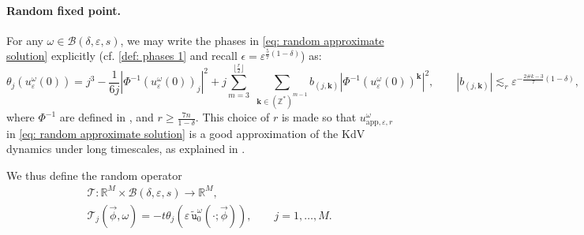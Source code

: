 \documentclass[a4paper,10pt,reqno]{article}
\theoremstyle{definition}
\theoremstyle{plain}
\theoremstyle{plain}
\theoremstyle{definition}
\theoremstyle{plain}
\theoremstyle{plain}
\theoremstyle{plain}
\theoremstyle{definition}
\theoremstyle{definition}
\def \Z{\mathbb Z}
\def \R{\mathbb R}
\def \k{\bm{k}}
\def \tu{\mathtt{u}}
\begin{document}
\paragraph{Random fixed point.}

For any $\omega\in\mathcal{B}(\delta,\varepsilon,s)$, we may write the phases in \eqref{eq: random approximate solution} explicitly (cf. \eqref{def: phases 1} and recall $\epsilon=\varepsilon^{\frac57 (1-\delta)}$) as:
\begin{equation}\label{eq: approx_phases random}
\theta_j(u_{\varepsilon}^{\omega}(0)) = j^3 - \frac{1}{6j} |\Phi^{-1}(u_{\varepsilon}^{\omega}(0))_j|^2 + j \sum_{m=3}^{\lfloor \frac{r}{2} \rfloor} \, \, \sum_{\k \in (\Z^*)^{m-1}} b_{(j,\k)} |\Phi^{-1}(u_{\varepsilon}^{\omega}(0))^{\k}|^2,  \qquad |b_{(j,\k)}| \lesssim_r \varepsilon^{-\frac{2\#k-3}{7}(1-\delta)},
\end{equation}
where $\Phi^{-1}$ are defined in , and $r \ge \frac{7n}{1-\delta}$. This choice of $r$ is made so that $u_{\mathrm{app},\varepsilon,r}^{\omega}$  in \eqref{eq: random approximate solution} is a good approximation of the KdV dynamics under long timescales, as explained in .

\medskip

We thus define the random operator
\begin{equation} \label{def: random phase nonlinear operator}
\begin{split}
& \mathcal{T} : \R^M \times \mathcal{B}(\delta,\varepsilon,s) \rightarrow \R^M,  \\
& \mathcal{T}_j(\vec{\phi},\omega) = -t \theta_j(\varepsilon\, \widetilde{\tu}_0^{\omega}(\cdot ; \vec{\phi})), \qquad j=1,\ldots,M.
\end{split}
\end{equation}
\end{document}
